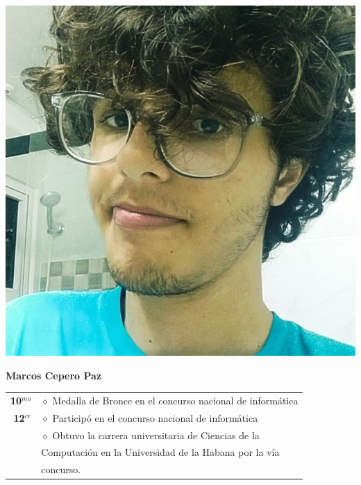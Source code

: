 \begin{minipage}{0.2\textwidth}
	\includegraphics[width=\linewidth]{img/concursantes/marco.png} %
\end{minipage}
\hfill
\begin{minipage}{0.7\textwidth}
	\textbf{Marcos Cepero Paz}
	
	\vspace*{0.1in}
	\begin{tabular}{rl}
		
		\textbf{10$^{mo}$} & $\diamond$ Medalla de Bronce en el concurso nacional de informática  \\
		
		
		\textbf{12$^{ce}$} 
		& $\diamond$ Participó en el concurso nacional de informática\\
		&   $\diamond$ Obtuvo la carrera universitaria de Ciencias de la \\
		& Computación en la Universidad de la Habana por la vía \\
		& concurso. \\
		
		
	\end{tabular}
	
\end{minipage}

\vspace*{0.2in}

